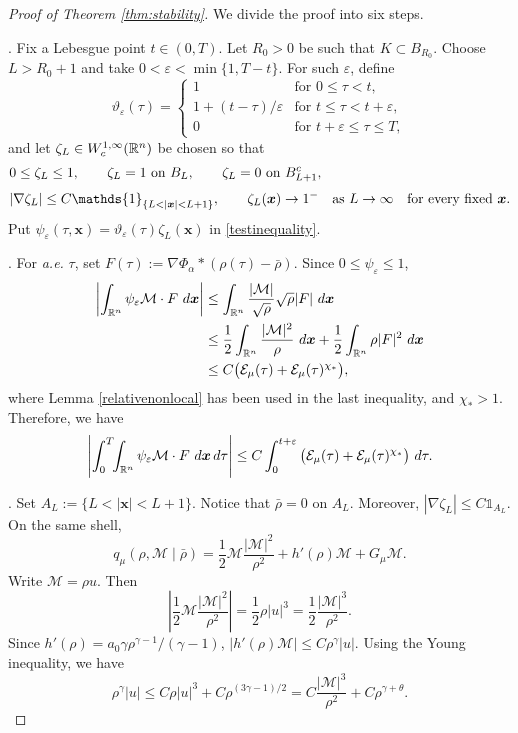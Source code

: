 \documentclass[10pt,a4paper]{amsart}
\def\dd{{\, \rm d}}
\begin{document}
\begin{proof}[Proof of {\rm Theorem \ref{thm:stability}}]
We divide the proof into six steps.

. Fix a Lebesgue point $t\in(0,T)$.   Let $R_0>0$ be such that
$K\subset B_{R_0}$.  Choose $L>R_0+1$ and take
$0<\varepsilon<\min\{1,T-t\}$.  For such $\varepsilon$, define
\[
\vartheta_\varepsilon(\tau)=
\begin{cases}
1& \mbox{for $0\le\tau<t$},\\
1+(t-\tau)/\varepsilon& \mbox{for $t\le\tau<t+\varepsilon$},\\
0&\mbox{for $t+\varepsilon\le\tau\le T$},
\end{cases}
\]
and let $\zeta_L\in W^{1,\infty}_{\rm c}(\mathbb R^n)$ be chosen so that
\begin{align*}
&0\le \zeta_L\le1,
\qquad
\zeta_L=1\ \text{on }B_L,
\qquad
\zeta_L=0\ \text{on }B_{L+1}^{\rm c},\\[1mm]
&|\nabla\zeta_L|\le C\mathds{1}_{\{L<|\boldsymbol{x}|<L+1\}},
 \qquad
 \zeta_L(\boldsymbol{x}) \to 1^- 
 \quad\text{as }L\to\infty
 \quad\text{for every fixed }\boldsymbol{x}.
\end{align*}
Put $\psi_\varepsilon(\tau,\boldsymbol{x})=\vartheta_\varepsilon(\tau)\zeta_L(\boldsymbol{x})$ in \eqref{testinequality}.

. For {\it a.e.} $\tau$, set $F(\tau):=\nabla\Phi_\alpha*(\rho(\tau)-\bar\rho)$.  Since $0\le\psi_\varepsilon\le1$,
\[
\begin{aligned}
\left|\int_{\mathbb R^n}\psi_\varepsilon\mathcal M\cdot F\,\dd\boldsymbol{x}\right|
&\le
\int_{\mathbb R^n}\frac{|\mathcal M|}{\sqrt\rho}\sqrt\rho |F|\,\dd\boldsymbol{x}\\
&\le
\frac12\int_{\mathbb R^n}\frac{|\mathcal M|^2}{\rho}\,\dd\boldsymbol{x}
+\frac12\int_{\mathbb R^n}\rho |F|^2\,\dd\boldsymbol{x}\\
&\le C\big(\mathcal E_\mu(\tau)+\mathcal E_\mu(\tau)^{\chi_*}\big),
\end{aligned}
\]
where Lemma \ref{relativenonlocal} has been used in the last inequality, 
and $\chi_*>1$.  Therefore, we have
\begin{equation}\label{sourceestimate}
\left|\int_0^T\!\!\int_{\mathbb R^n}
\psi_\varepsilon\mathcal M\cdot F\,\dd\boldsymbol{x}\dd\tau\right|
\le C\int_0^{t+\varepsilon}
\big(\mathcal E_\mu(\tau)+\mathcal E_\mu(\tau)^{\chi_*}\big)\,\dd\tau.
\end{equation}

. Set $A_L:=\{L<|\boldsymbol{x}|<L+1\}$.  Notice that $\bar\rho=0$ on $A_L$. 
Moreover,
$
 |\nabla\zeta_L|\le C\mathds{1}_{A_L}.
$
On the same shell,
\[
 q_\mu(\rho,\mathcal M\mid\bar\rho)
=\frac12\mathcal M\frac{|\mathcal M|^2}{\rho^2}+h'(\rho)\mathcal M+G_\mu\mathcal M.
\]
Write $\mathcal M=\rho u$.  Then
\[
 \left|\frac12\mathcal M\frac{|\mathcal M|^2}{\rho^2}\right|
  =\frac12\rho |u|^3
  =\frac12\frac{|\mathcal M|^3}{\rho^2}.
\]
Since $h'(\rho)=a_0\gamma\rho^{\gamma-1}/(\gamma-1)$, $
 |h'(\rho)\mathcal M|
 \le C\rho^\gamma |u|.$
Using the Young inequality, we have
\[
\rho^\gamma|u|
 \le C\rho |u|^3+C\rho^{(3\gamma-1)/2}
 =C\frac{|\mathcal M|^3}{\rho^2}+C\rho^{\gamma+\theta}.
\]


\end{proof}
\end{document}

